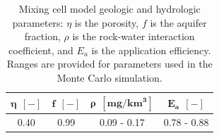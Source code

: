 \begin{table}[H]
	
	\caption{Mixing cell model geologic and hydrologic parameters: $\eta$ is the porosity, $f$ is the aquifer fraction, $\rho$ is the rock-water interaction coefficient, and $E_a$ is the application efficiency. Ranges are provided for parameters used in the Monte Carlo simulation.}
	
	\centering
	
	\begin{tabular}{cccc}
		
		$\bm{\eta \:\: [-]}$ & $\bm{f \:\: [-]}$ & $\bm{\rho \:\: [mg/km^3]}$ & $\bm{E_a \:\: [-]}$\\ 
		\hline
		0.40 & 0.99 & 0.09 - 0.17 & 0.78 - 0.88\\ 
		\hline
	\end{tabular}
	
	\label{ap_b_geometry}
\end{table}








\renewcommand{\arraystretch}{0.8}
\setlength{\tabcolsep}{3.5 em}




